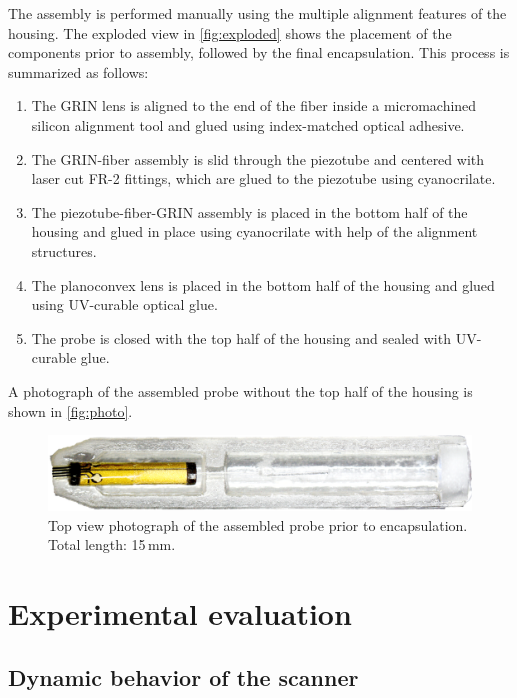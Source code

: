 \documentclass[10pt]{iopart}
\begin{document}
The assembly is performed manually using the multiple alignment features of the housing. The exploded view in \autoref{fig:exploded} shows the placement of the components prior to assembly, followed by the final encapsulation. This process is summarized as follows:

\begin{enumerate}
\item The GRIN lens is aligned to the end of the fiber inside a micromachined silicon alignment tool and glued using index-matched optical adhesive.
\item The GRIN-fiber assembly is slid through the piezotube and centered with laser cut FR-2 fittings, which are glued to the piezotube using cyanocrilate.
\item The piezotube-fiber-GRIN assembly is placed in the bottom half of the housing and glued in place using cyanocrilate with help of the alignment structures.
\item The planoconvex lens is placed in the bottom half of the housing and glued using UV-curable optical glue.
\item The probe is closed with the top half of the housing and sealed with UV-curable glue.
\end{enumerate}

A photograph of the assembled probe without the top half of the housing is shown in \autoref{fig:photo}.

\begin{figure}[h!]\centering \includegraphics[width=\columnwidth]{figures/half.png}
      \caption{Top view photograph of the assembled probe prior to encapsulation. Total length: 15\,mm.}
      \label{fig:photo}
\end{figure}

\section{Experimental evaluation} \label{sec:meas}
\subsection{Dynamic behavior of the scanner}
\label{sec:whirling}
\end{document}
